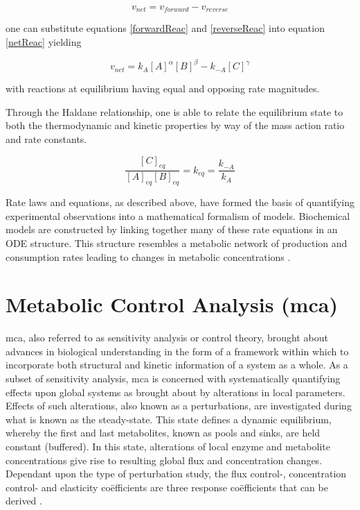 \begin{equation}\label{netReac}
v_{net} = v_{forward} - v_{reverse}
\end{equation}

one can substitute equations \ref{forwardReac} and \ref{reverseReac} into equation \ref{netReac} yielding 

\begin{equation}
v_{net} = k_A[A]^\alpha[B]^\beta - k_{-A}[C]^\gamma
\end{equation}

with reactions at equilibrium having equal and opposing rate magnitudes.

Through the Haldane relationship, one is able to relate the equilibrium state to both the thermodynamic and kinetic properties by way of the mass action ratio and rate constants.

\begin{equation}
\frac{[C]_{eq}}{[A]_{eq}[B]_{eq}} = k_{eq} = \frac{k_{-A}}{k_A}
\end{equation}

Rate laws and equations, as described above, have formed the basis of quantifying experimental observations into a mathematical formalism of models. Biochemical models are constructed by linking together many of these rate equations in an ODE structure. This structure resembles a metabolic network of production and consumption rates leading to changes in metabolic concentrations \cite{Copeland2000, Hynne2001, Kell2006}. 

\section{Metabolic Control Analysis (\gls{mca})}
\gls{mca}, also referred to as sensitivity analysis or control theory, brought about advances in biological understanding in the form of a framework within which to incorporate both structural and kinetic information of a system as a whole. As a subset of sensitivity analysis, \gls{mca} is concerned with systematically quantifying effects upon global systems as brought about by alterations in local parameters. Effects of such alterations, also known as a perturbations, are investigated during what is known as the \gls{steady-state}. This state defines a dynamic equilibrium, whereby the first and last metabolites, known as pools and sinks, are held constant (buffered). In this state, alterations of local enzyme and metabolite concentrations give rise to resulting global flux and concentration changes. Dependant upon the type of perturbation study, the flux control-, concentration control- and elasticity co\"efficients are three response co\"efficients that can be derived \citep{Kacser1979, Kacser1968}. 

